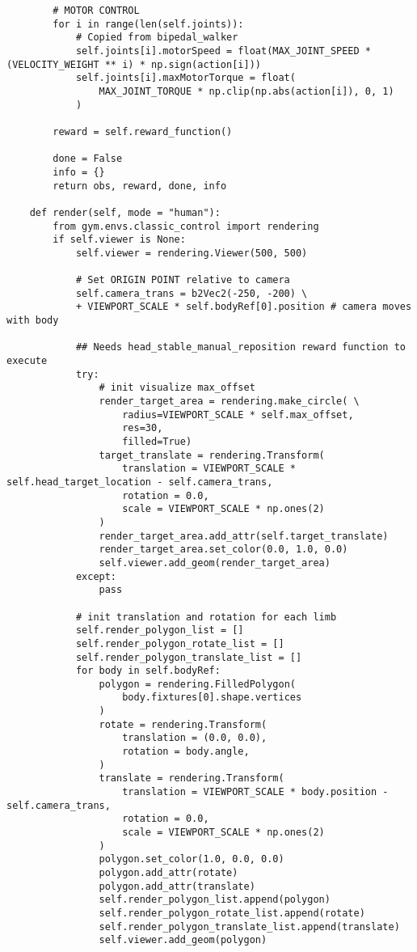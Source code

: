 \begin{itemize}
\begin{lstlisting}
        # MOTOR CONTROL
        for i in range(len(self.joints)):
            # Copied from bipedal_walker
            self.joints[i].motorSpeed = float(MAX_JOINT_SPEED * (VELOCITY_WEIGHT ** i) * np.sign(action[i]))
            self.joints[i].maxMotorTorque = float(
                MAX_JOINT_TORQUE * np.clip(np.abs(action[i]), 0, 1)
            )

        reward = self.reward_function()

        done = False
        info = {}
        return obs, reward, done, info

    def render(self, mode = "human"):
        from gym.envs.classic_control import rendering
        if self.viewer is None:
            self.viewer = rendering.Viewer(500, 500)

            # Set ORIGIN POINT relative to camera
            self.camera_trans = b2Vec2(-250, -200) \
            + VIEWPORT_SCALE * self.bodyRef[0].position # camera moves with body

            ## Needs head_stable_manual_reposition reward function to execute
            try:
                # init visualize max_offset
                render_target_area = rendering.make_circle( \
                    radius=VIEWPORT_SCALE * self.max_offset,
                    res=30,
                    filled=True)
                target_translate = rendering.Transform(
                    translation = VIEWPORT_SCALE * self.head_target_location - self.camera_trans,
                    rotation = 0.0,
                    scale = VIEWPORT_SCALE * np.ones(2)
                )
                render_target_area.add_attr(self.target_translate)
                render_target_area.set_color(0.0, 1.0, 0.0)
                self.viewer.add_geom(render_target_area)
            except:
                pass

            # init translation and rotation for each limb
            self.render_polygon_list = []
            self.render_polygon_rotate_list = []
            self.render_polygon_translate_list = []
            for body in self.bodyRef:
                polygon = rendering.FilledPolygon(
                    body.fixtures[0].shape.vertices
                )
                rotate = rendering.Transform(
                    translation = (0.0, 0.0),
                    rotation = body.angle,
                )
                translate = rendering.Transform(
                    translation = VIEWPORT_SCALE * body.position - self.camera_trans,
                    rotation = 0.0,
                    scale = VIEWPORT_SCALE * np.ones(2)
                )
                polygon.set_color(1.0, 0.0, 0.0)
                polygon.add_attr(rotate)
                polygon.add_attr(translate)
                self.render_polygon_list.append(polygon)
                self.render_polygon_rotate_list.append(rotate)
                self.render_polygon_translate_list.append(translate)
                self.viewer.add_geom(polygon)


\end{lstlisting}
\end{itemize}
